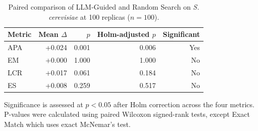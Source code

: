 \begin{table}[!tb]
  \centering
  \caption{Paired comparison of LLM-Guided and Random Search on {\normalfont\itshape S. cerevisiae} at 100 replicas ($n=100$).}
  \label{tab:llm_random_significance_yeast_r100}
  \scriptsize
  \setlength{\tabcolsep}{4pt}
  \begin{tabular}{lrrrr}
    \toprule
    Metric & Mean $\Delta$ & $p$ & Holm-adjusted $p$ & Significant \\
    \midrule
    APA & +0.024 & 0.001 & 0.006 & Yes \\
    EM & +0.000 & 1.000 & 1.000 & No \\
    LCR & +0.017 & 0.061 & 0.184 & No \\
    ES & +0.008 & 0.259 & 0.517 & No \\
    \bottomrule
  \end{tabular}
  \par\smallskip\footnotesize{Significance is assessed at $p<0.05$ after Holm correction across the four metrics. P-values were calculated using paired Wilcoxon signed-rank tests, except Exact Match which uses exact McNemar's test.}
\end{table}
